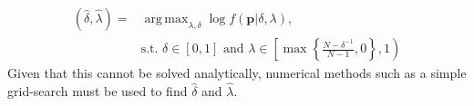 \documentclass[11pt]{article}
\DeclareMathOperator*{\argmax}{arg\,max}
\theoremstyle{definition}
\theoremstyle{definition}
\begin{document}
\begin{align*}
\left(\hat{\delta}, \hat{\lambda}\right) =& \argmax_{\lambda, \delta} \log  f\left(\boldsymbol{p}| \delta, \lambda \right),\\
& \text{s.t. } \nonumber \delta \in [0,1] \text{ and } \lambda \in \left[  \max \left\{ \frac{N-\delta^{-1}}{N-1}, 0\right\}, 1 \right)
\end{align*}
Given that this cannot be solved analytically, numerical methods such as a simple grid-search must be used to find $\hat{\delta}$ and $\hat{\lambda}$. 

% 

%
%

\end{document}
